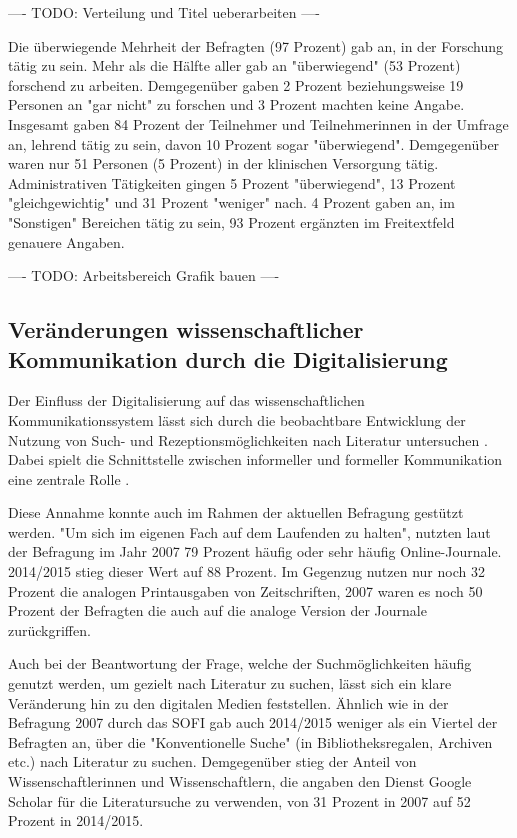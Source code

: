 ---- TODO: Verteilung und Titel ueberarbeiten ----

Die überwiegende Mehrheit der Befragten (97 Prozent) gab an, in der Forschung tätig zu sein. Mehr als die Hälfte aller gab an "überwiegend" (53 Prozent) forschend zu arbeiten. Demgegenüber gaben 2 Prozent beziehungsweise 19 Personen an "gar nicht" zu forschen und 3 Prozent machten keine Angabe. Insgesamt gaben 84 Prozent der Teilnehmer und Teilnehmerinnen in der Umfrage an, lehrend tätig zu sein, davon 10 Prozent sogar "überwiegend". Demgegenüber waren nur 51 Personen (5 Prozent) in der klinischen Versorgung tätig. Administrativen Tätigkeiten gingen 5 Prozent "überwiegend", 13 Prozent "gleichgewichtig" und 31 Prozent "weniger" nach. 4 Prozent gaben an, im "Sonstigen" Bereichen tätig zu sein, 93 Prozent ergänzten im Freitextfeld genauere Angaben.

---- TODO: Arbeitsbereich Grafik bauen ----

\subsection{Veränderungen wissenschaftlicher Kommunikation durch die Digitalisierung}

Der Einfluss der Digitalisierung auf das wissenschaftlichen Kommunikationssystem lässt sich durch die beobachtbare Entwicklung der Nutzung von Such- und Rezeptionsmöglichkeiten nach Literatur untersuchen \cite{Hanekop_2014}. Dabei spielt die Schnittstelle zwischen informeller und formeller Kommunikation eine zentrale Rolle \cite{Hanekop_2014}.

Diese Annahme konnte auch im Rahmen der aktuellen Befragung gestützt werden. "Um sich im eigenen Fach auf dem Laufenden zu halten", nutzten laut der Befragung im Jahr 2007 79 Prozent häufig oder sehr häufig Online-Journale. 2014/2015 stieg dieser Wert auf 88 Prozent. Im Gegenzug nutzen nur noch 32 Prozent die analogen Printausgaben von Zeitschriften, 2007 waren es noch 50 Prozent der Befragten die auch auf die analoge Version der Journale zurückgriffen.

Auch bei der Beantwortung der Frage, welche der Suchmöglichkeiten häufig genutzt werden, um gezielt nach Literatur zu suchen, lässt sich ein klare Veränderung hin zu den digitalen Medien feststellen. Ähnlich wie in der Befragung 2007 durch das SOFI gab auch 2014/2015 weniger als ein Viertel der Befragten an, über die "Konventionelle Suche" (in Bibliotheksregalen, Archiven etc.) nach Literatur zu suchen. Demgegenüber stieg der Anteil von Wissenschaftlerinnen und Wissenschaftlern, die angaben den Dienst Google Scholar für die Literatursuche zu verwenden, von 31 Prozent in 2007 auf 52 Prozent in 2014/2015.

